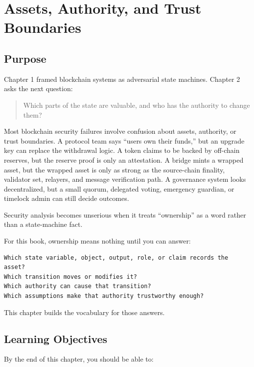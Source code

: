 \chapter{Assets, Authority, and Trust Boundaries}

\section{Purpose}

Chapter 1 framed blockchain systems as adversarial state machines.
Chapter 2 asks the next question:

\begin{quote}
Which parts of the state are valuable, and who has the authority to
change them?
\end{quote}

Most blockchain security failures involve confusion about assets,
authority, or trust boundaries. A protocol team says ``users own their
funds,'' but an upgrade key can replace the withdrawal logic. A token
claims to be backed by off-chain reserves, but the reserve proof is only
an attestation. A bridge mints a wrapped asset, but the wrapped asset is
only as strong as the source-chain finality, validator set, relayers,
and message verification path. A governance system looks decentralized,
but a small quorum, delegated voting, emergency guardian, or timelock
admin can still decide outcomes.

Security analysis becomes unserious when it treats ``ownership'' as a
word rather than a state-machine fact.

For this book, ownership means nothing until you can answer:

\begin{lstlisting}
Which state variable, object, output, role, or claim records the asset?
Which transition moves or modifies it?
Which authority can cause that transition?
Which assumptions make that authority trustworthy enough?
\end{lstlisting}

This chapter builds the vocabulary for those answers.

\section{Learning Objectives}

By the end of this chapter, you should be able to:


